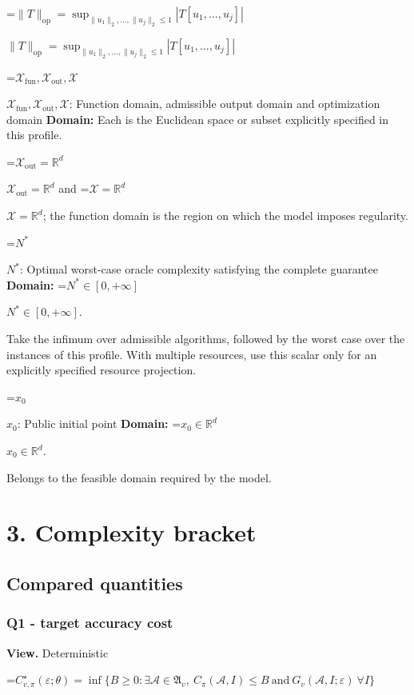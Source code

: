 \documentclass[10pt,a4paper]{article}
\newcommand{\AtlasMath}[1]{\par\begingroup\centering\setbox0=\hbox{$\displaystyle #1$}\ifdim\wd0>1.4\linewidth\typeout{ATLAS WIDE FORMULA: \the\wd0}\fi\ifdim\wd0>\linewidth\resizebox{\linewidth}{!}{\box0}\else\box0\fi\par\endgroup}
\newcommand{\AtlasInlineMath}[1]{\begingroup\setbox0=\hbox{$#1$}\ifdim\wd0>.4\linewidth\endgroup\AtlasMath{#1}\else\endgroup$#1$\fi}
\begin{document}
\AtlasInlineMath{\|T\|_{\mathrm{op}}=\sup_{\|u_1\|_2,\ldots,\|u_j\|_2\le1}|T[u_1,\ldots,u_j]|}



\AtlasInlineMath{\mathcal{X}_{\mathrm{fun}},\mathcal{X}_{\mathrm{out}},\mathcal{X}}: Function domain, admissible output domain and optimization domain \textbf{Domain:} Each is the Euclidean space or subset explicitly specified in this profile.



\AtlasInlineMath{\mathcal{X}_{\mathrm{out}}=\mathbb{R}^d} and \AtlasInlineMath{\mathcal{X}=\mathbb{R}^d}; the function domain is the region on which the model imposes regularity.



\AtlasInlineMath{N^*}: Optimal worst-case oracle complexity satisfying the complete guarantee \textbf{Domain:} \AtlasInlineMath{N^*\in[0,+\infty]}.



Take the infimum over admissible algorithms, followed by the worst case over the instances of this profile. With multiple resources, use this scalar only for an explicitly specified resource projection.



\AtlasInlineMath{x_0}: Public initial point \textbf{Domain:} \AtlasInlineMath{x_0\in\mathbb{R}^d}.



Belongs to the feasible domain required by the model.



\section{3. Complexity bracket}


\subsection{Compared quantities}


\subsubsection{Q1 - target accuracy cost}


\textbf{View.} Deterministic



\AtlasMath{C^\star_{v,\pi}(\varepsilon;\theta)=\inf\{B\ge0:\exists\mathcal A\in\mathfrak A_v,\ C_\pi(\mathcal A,I)\le B\ \text{and}\ G_v(\mathcal A,I;\varepsilon)\ \forall I\}}
\end{document}
